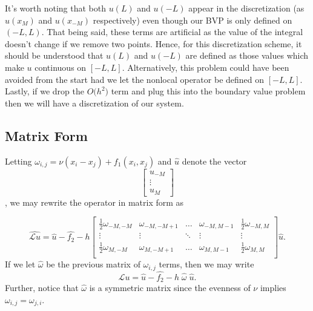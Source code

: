\documentclass[pra,onecolumn,superscriptaddress,aps]{revtex4}
\begin{document}
It's worth noting that both $u(L)$ and $u(-L)$ appear in the discretization (as $u(x_{\scriptscriptstyle M})$ and $u(x_{\scriptscriptstyle -M})$ respectively) even though our BVP is only defined on $(-L,L)$. That being said, these terms are artificial  as the value of the integral doesn't change if we remove two points. Hence, for this discretization scheme, it should be understood that $u(L)$ and $u(-L)$ are defined as those values which make $u$ continuous on $[-L,L]$. Alternatively, this problem could have been avoided from the start had we let the nonlocal operator be defined on $[-L,L]$.\\

Lastly, if we drop the $O\big(h^2 \big)$ term and plug this into the boundary value problem then we will have a discretization of our system. 

\subsection{Matrix Form}
Letting $\omega_{i,j} = \nu(x_i - x_j) + f_1(x_i, x_j)$ and $\hat{u}$ denote the vector
\begin{equation*}
\begin{bmatrix}
u_{\scriptscriptstyle-M} \\
\vdots \\
u_{\scriptscriptstyle M}
\end{bmatrix}
\end{equation*}, we may rewrite the operator in matrix form as

\begin{equation*}
\widehat{\mathcal{L} u} = \hat{u} - \hat{f_2} -
h\begin{bmatrix}
\frac{1}{2}\omega_{{\scriptscriptstyle -M},{\scriptscriptstyle -M}} 
& \omega_{{\scriptscriptstyle -M},{\scriptscriptstyle -M+1}} 
& \dots 
& \omega_{{\scriptscriptstyle -M},{\scriptscriptstyle M-1}}
& \frac{1}{2}\omega_{{\scriptscriptstyle -M},{\scriptscriptstyle M}} \\
\vdots & \vdots & \ddots & \vdots & \vdots\\
\frac{1}{2}\omega_{{\scriptscriptstyle M},{\scriptscriptstyle -M}} 
& \omega_{{\scriptscriptstyle M},{\scriptscriptstyle -M+1}} 
& \dots 
& \omega_{{\scriptscriptstyle M},{\scriptscriptstyle M-1}}
& \frac{1}{2}\omega_{{\scriptscriptstyle M},{\scriptscriptstyle M}} \\
\end{bmatrix}\hat{u}.
\end{equation*}
If we let $\hat{\omega}$ be the previous matrix of $\omega_{i,j}$ terms, then we may write
\begin{equation*}
\widehat{\mathcal{L} u} = \hat{u} - \hat{f_2} - h \; \hat{\omega} \; \hat{u}.
\end{equation*}
Further, notice that $\hat{\omega}$ is a symmetric matrix since the evenness of $\nu$ implies $\omega_{i,j} = \omega_{j,i}$.
\end{document}
